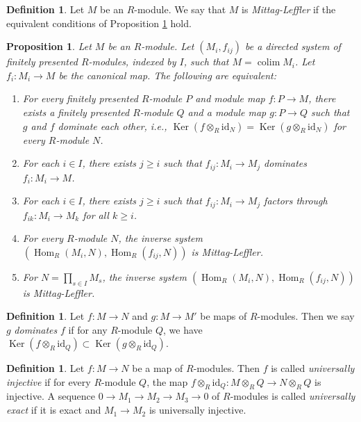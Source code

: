 \documentclass{amsart}
\theoremstyle{plain}
\newtheorem{proposition}[subsection]{Proposition}
\theoremstyle{definition}
\newtheorem{definition}[subsection]{Definition}
\theoremstyle{remark}
\numberwithin{equation}{subsection}
\def\colim{\mathop{\mathrm{colim}}\nolimits}
\def\Hom{\mathop{\mathrm{Hom}}\nolimits}
\def\Ker{\mathop{\mathrm{Ker}}}
\begin{document}
\begin{definition}
\label{definition-mittag-leffler-module}
Let $M$ be an $R$-module.  We say that $M$ is {\it Mittag-Leffler} if the
equivalent conditions of
Proposition \ref{proposition-ML-characterization}
hold.
\end{definition}

\begin{proposition}
\label{proposition-ML-characterization}
Let $M$ be an $R$-module.  Let $(M_i, f_{ij})$ be a directed system of finitely
presented $R$-modules, indexed by $I$, such that $M = \colim M_i$.  Let
$f_i:
M_i \to M$ be the canonical map.  The following are equivalent:
\begin{enumerate}
\item For every finitely presented $R$-module $P$ and module map $f: P
\to M$, there exists a finitely presented $R$-module $Q$ and a module
map $g: P \to Q$ such that $g$ and $f$ dominate each other, i.e.,
$\Ker(f \otimes_R \text{id}_N) = \Ker(g \otimes_R \text{id}_N)$
for every $R$-module $N$.
\item For each $i \in I$, there exists $j \geq i$ such that $f_{ij}: M_i
\to M_j$ dominates $f_i: M_i \to M$.
\item For each $i \in I$, there exists $j \geq i$ such that $f_{ij}: M_i
\to M_j$ factors through $f_{ik}: M_i \to M_k$ for all $k \geq
i$.
\item For every $R$-module $N$, the inverse system
$(\Hom_R(M_i, N), \Hom_R(f_{ij}, N))$ is Mittag-Leffler.
\item For $N = \prod_{s \in I} M_s$, the inverse system
$(\Hom_R(M_i, N), \Hom_R(f_{ij}, N))$ is Mittag-Leffler.
\end{enumerate}
\end{proposition}

\begin{definition}
\label{definition-domination}
Let $f: M \to N$ and $g: M \to M'$ be maps of $R$-modules.
Then we say $g$ {\it dominates} $f$ if for any $R$-module $Q$, we have $\Ker(f
\otimes_R \text{id}_Q) \subset \Ker(g \otimes_R \text{id}_Q)$.
\end{definition}

\begin{definition}
\label{definition-universally-injective}
Let $f: M \to N$ be a map of $R$-modules.  Then $f$ is called
{\it universally injective} if for every $R$-module $Q$, the map $f
\otimes_R \text{id}_Q: M \otimes_R Q \to N \otimes_R Q$
is injective.  A sequence $0 \to M_1 \to M_2 \to M_3
\to 0$ of $R$-modules is called {\it universally exact} if it is exact
and $M_1 \to M_2$ is universally injective.
\end{definition}
\end{document}
